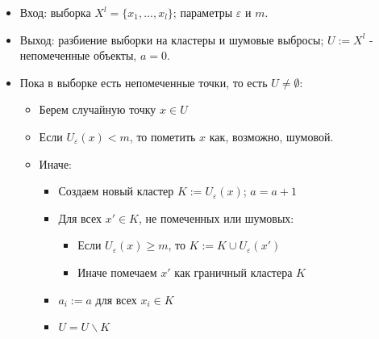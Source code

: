 \begin{itemize}
    \item Вход: выборка $X^{l} = \{ x_1, ..., x_l\}$; параметры $\varepsilon$ и $m$.
    \item Выход: разбиение выборки на кластеры и шумовые выбросы; $U := X^{l}$ - непомеченные объекты, $a = 0$.
    \item Пока в выборке есть непомеченные точки, то есть $U \neq \emptyset$:
          \begin{itemize}
              \item Берем случайную точку $x \in U$
              \item Если $U_{\varepsilon}(x) < m$, то пометить $x$ как, возможно, шумовой.
              \item Иначе:
                    \begin{itemize}
                        \item Создаем новый кластер $K := U_{\varepsilon}(x)$; $a = a + 1$
                        \item Для всех $x' \in K$, не помеченных или шумовых:
                              \begin{itemize}
                                  \item Если $U_{\varepsilon}(x) \geq m$, то $K := K \cup U_{\varepsilon}(x')$
                                  \item Иначе помечаем $x'$ как граничный кластера $K$
                              \end{itemize}
                        \item $a_i := a$ для всех $x_i \in K$
                        \item $U = U \backslash K$
                    \end{itemize}
          \end{itemize}
\end{itemize}
